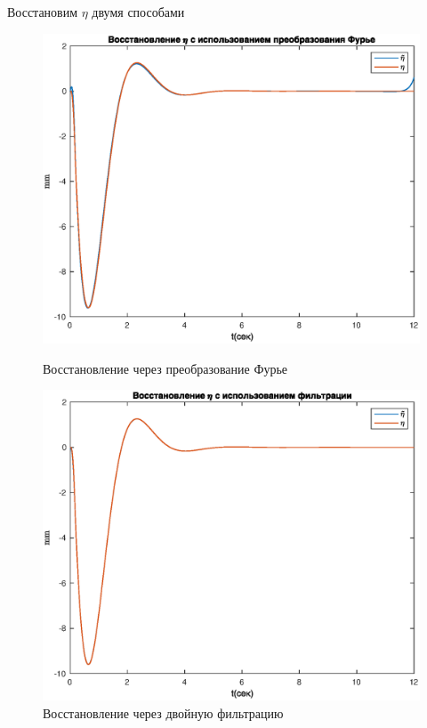 \documentclass[a4paper,12pt, openany]{book}
\theoremstyle{plain} %
\theoremstyle{definition} %
\theoremstyle{remark} %
\numberwithin{equation}{chapter}
\begin{document}
{Восстановим $\eta$ двумя способами
\begin{figure}[h!]
    \begin{center}
        \begin{minipage}[h]{0.48\linewidth}
            \includegraphics[width=1\linewidth]{eta_restore_fur_model.eps}
            \caption{Восстановление через преобразование Фурье}
        \end{minipage}
        \hfill
        \begin{minipage}[h]{0.48\linewidth}
            \includegraphics[width=1\linewidth]{double_filter_model.eps}
            \caption{Восстановление через двойную фильтрацию}
        \end{minipage}
    \end{center}
\end{figure}


}
\end{document}
